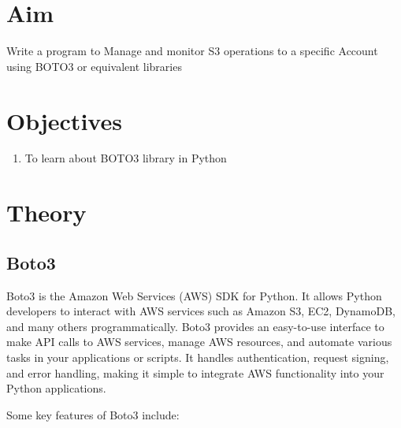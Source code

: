 \documentclass[11pt]{article}
\begin{document}
\tableofcontents
\thispagestyle{empty}
\clearpage

\setcounter{page}{1}

\section{Aim}
Write a program to Manage and monitor S3 operations to a specific Account using BOTO3 or
equivalent libraries

\section{Objectives}
\begin{enumerate}
    \item To learn about BOTO3 library in Python
\end{enumerate}

\section{Theory}

\subsection{Boto3}

Boto3 is the Amazon Web Services (AWS) SDK for Python. It allows Python developers to interact with AWS services such as Amazon S3, EC2, DynamoDB, and many others programmatically. Boto3 provides an easy-to-use interface to make API calls to AWS services, manage AWS resources, and automate various tasks in your applications or scripts. It handles authentication, request signing, and error handling, making it simple to integrate AWS functionality into your Python applications.

Some key features of Boto3 include:
\end{document}
